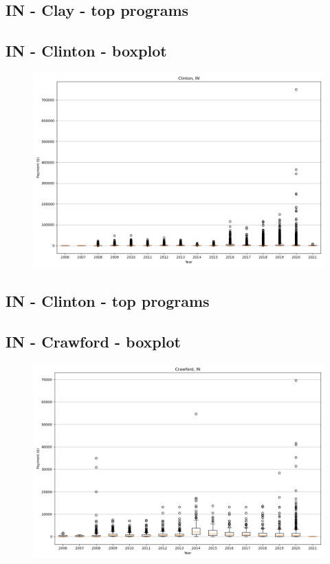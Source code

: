 \subsection*{IN - Clay - top programs}

\newpage
\subsection*{IN - Clinton - boxplot}
\begin{figure}[h]
\centering
\includegraphics[width=7in]{../output/boxplots/counties/Clinton-IN_boxplot.png}
\end{figure}


\subsection*{IN - Clinton - top programs}

\newpage
\subsection*{IN - Crawford - boxplot}
\begin{figure}[h]
\centering
\includegraphics[width=7in]{../output/boxplots/counties/Crawford-IN_boxplot.png}
\end{figure}


